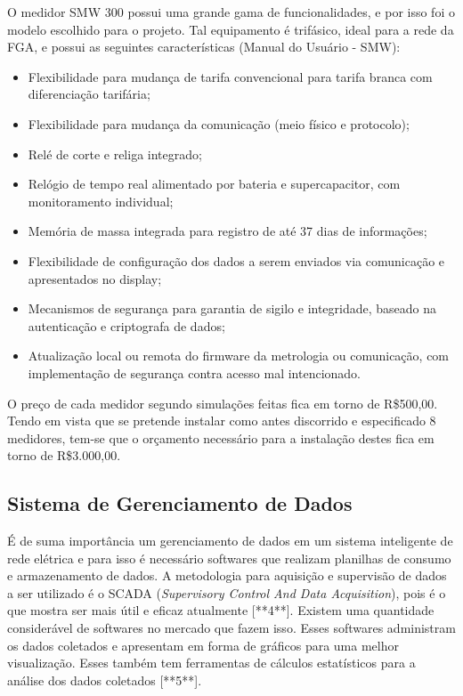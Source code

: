 O medidor SMW 300 possui uma grande gama de funcionalidades, e por isso foi o
modelo escolhido para o projeto. Tal equipamento é trifásico, ideal para a rede da FGA, e possui as seguintes características (Manual do Usuário - SMW):
\begin{itemize}
\item Flexibilidade para mudança de tarifa convencional para tarifa branca com diferenciação tarifária;
\item Flexibilidade para mudança da comunicação (meio físico e protocolo);
\item Relé de corte e religa integrado;
\item Relógio de tempo real alimentado por bateria e supercapacitor, com monitoramento individual;
\item Memória de massa integrada para registro de até 37 dias de informações;
\item Flexibilidade de configuração dos dados a serem enviados via comunicação e apresentados no display;
\item Mecanismos de segurança para garantia de sigilo e integridade, baseado na autenticação e criptografa de dados;
\item Atualização local ou remota do firmware da metrologia ou comunicação, com implementação de segurança contra acesso mal intencionado.
\end{itemize}

O preço de cada medidor segundo simulações feitas fica em torno de R\$500,00. Tendo em vista que se pretende instalar como antes discorrido e especificado 8 medidores, tem-se que o orçamento necessário para a instalação destes fica em torno de R\$3.000,00.

\subsection{Sistema de Gerenciamento de Dados}
É de suma importância um gerenciamento de dados em um sistema inteligente de rede elétrica e para isso é necessário softwares que realizam planilhas de consumo e armazenamento de dados. A metodologia para aquisição e supervisão de dados a ser utilizado é o SCADA (\textit{Supervisory Control And Data Acquisition}), pois é o que mostra ser mais útil e eficaz atualmente [**4**]. Existem uma quantidade considerável de softwares no mercado que fazem isso. Esses softwares administram os dados coletados e apresentam em forma de gráficos para uma melhor visualização. Esses também tem ferramentas de cálculos estatísticos para a análise dos dados coletados [**5**].

